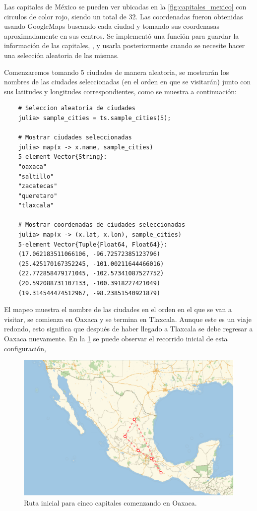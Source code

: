 Las capitales de México se pueden ver ubicadas en la \cref{fig:capitales_mexico} con circulos de color rojo, siendo un total de 32. Las coordenadas fueron obtenidas usando GoogleMaps buscando cada ciudad y tomando sus coordenasas aproximadamente en sus centros. Se implementó una función para guardar la información de las capitales, , y usarla posteriormente cuando se necesite hacer una selección aleatoria de las mismas.

Comenzaremos tomando 5 ciudades de manera aleatoria, se mostrarán los nombres de las ciudades seleccionadas (en el orden en que se visitarán) junto con sus latitudes y longitudes correspondientes, como se muestra a continuación:
\begin{verbatim}
    # Seleccion aleatoria de ciudades
    julia> sample_cities = ts.sample_cities(5);

    # Mostrar ciudades seleccionadas
    julia> map(x -> x.name, sample_cities)
    5-element Vector{String}:
    "oaxaca"
    "saltillo"
    "zacatecas"
    "queretaro"
    "tlaxcala"

    # Mostrar coordenadas de ciudades seleccionadas
    julia> map(x -> (x.lat, x.lon), sample_cities)
    5-element Vector{Tuple{Float64, Float64}}:
    (17.062183511066106, -96.72572385123796)
    (25.425170167352245, -101.00211644466016)
    (22.772858479171045, -102.57341087527752)
    (20.592088731107133, -100.3918227421049)
    (19.314544474512967, -98.23851540921879)
\end{verbatim}

El mapeo muestra el nombre de las ciudades en el orden en el que se van a visitar, se comienza en Oaxaca y se termina en Tlaxcala. Aunque este es un viaje redondo, esto significa que después de haber llegado a Tlaxcala se debe regresar a Oaxaca nuevamente. En la \cref{fig:trip_cities_05_init} se puede observar el recorrido inicial de esta configuración, 
\begin{figure}[ht!]
    \centering
    \includegraphics[scale=0.8]{../figures/trip_cities_05_init.pdf}
    \caption{Ruta inicial para cinco capitales comenzando en Oaxaca.}
    \label{fig:trip_cities_05_init}
\end{figure}

